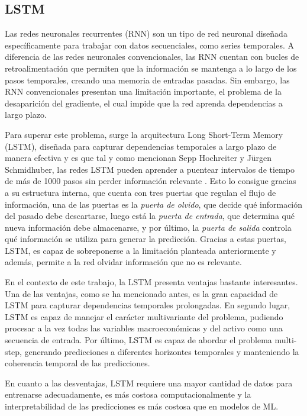 \subsection{LSTM}
Las redes neuronales recurrentes \cite{rnn} (RNN) son un tipo de red neuronal diseñada específicamente para trabajar con datos secuenciales, como series temporales. A diferencia de las redes neuronales convencionales, las RNN cuentan con bucles de retroalimentación que permiten que la información se mantenga a lo largo de los pasos temporales, creando una memoria de entradas pasadas. Sin embargo, las RNN convencionales presentan una limitación importante, el problema de la desaparición del gradiente, el cual impide que la red aprenda dependencias a largo plazo.

Para superar este problema, surge la arquitectura Long Short-Term Memory (LSTM), diseñada para capturar dependencias temporales a largo plazo de manera efectiva y es que tal y como mencionan Sepp Hochreiter y Jürgen Schmidhuber, las redes LSTM pueden aprender a puentear intervalos de tiempo de más de 1000 pasos sin perder información relevante \cite{hochreiter1997}. Esto lo consigue gracias a su estructura interna, que cuenta con tres puertas que regulan el flujo de información, una de las puertas es la \emph{puerta de olvido}, que decide qué información del pasado debe descartarse, luego está la \emph{puerta de entrada}, que determina qué nueva información debe almacenarse, y por último, la \emph{puerta de salida} controla qué información se utiliza para generar la predicción. Gracias a estas puertas, LSTM, es capaz de sobreponerse a la limitación planteada anteriormente y además, permite a la red olvidar información que no es relevante.

En el contexto de este trabajo, la LSTM presenta ventajas bastante interesantes. Una de las ventajas, como se ha mencionado antes, es la gran capacidad de LSTM para capturar dependencias temporales prolongadas. En segundo lugar, LSTM es capaz de manejar el carácter multivariante del problema, pudiendo procesar a la vez todas las variables macroeconómicas y del activo como una secuencia de entrada. Por último, LSTM es capaz de abordar el problema multi-step, generando predicciones a diferentes horizontes temporales y manteniendo la coherencia temporal de las predicciones. 

En cuanto a las desventajas, LSTM requiere una mayor cantidad de datos para entrenarse adecuadamente, es más costosa computacionalmente y la interpretabilidad de las predicciones es más costosa que en modelos de ML. 

